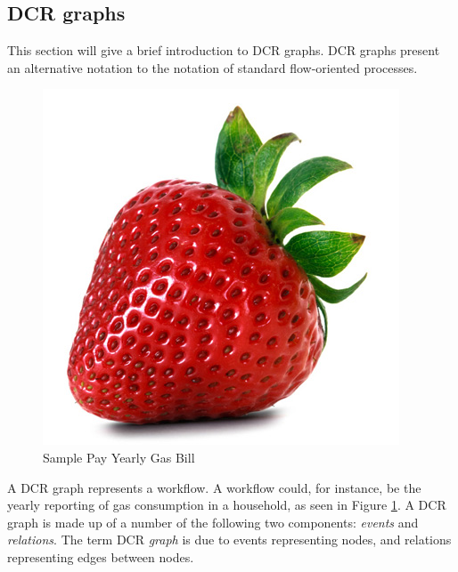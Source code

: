\subsection{DCR graphs}
This section will give a brief introduction to DCR graphs. DCR graphs present an alternative notation to the notation of standard flow-oriented processes.

\begin{figure}[h!]
\center
\includegraphics[width=0.5\linewidth]{Figures/strawberry}
\caption{\label{SampleGasFlow} Sample Pay Yearly Gas Bill }
\end{figure}

A DCR graph represents a workflow. A workflow could, for instance, be the yearly reporting of gas consumption in a household, as seen in Figure \ref{SampleGasFlow}. A DCR graph is made up of a number of the following two components: \textit{events} and \textit{relations}. The term DCR \textit{graph} is due to events representing nodes, and relations representing edges between nodes.



